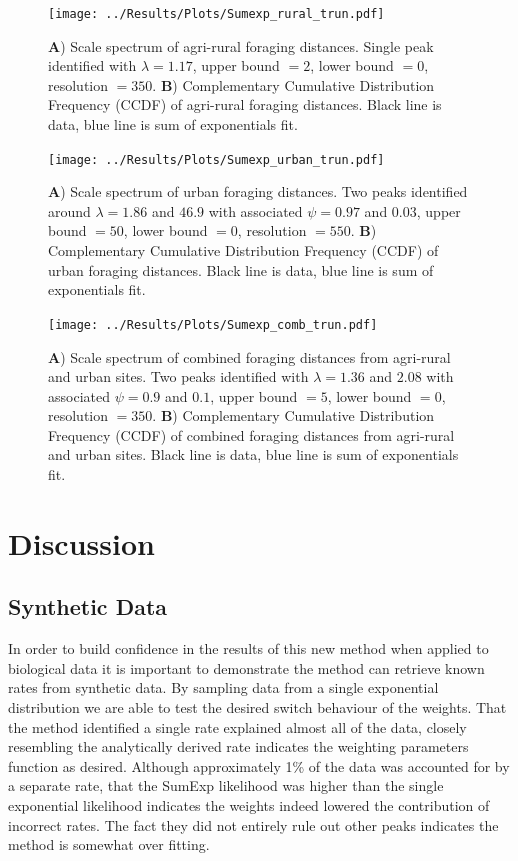 \documentclass[11pt,usenames,dvipsnames]{article}
\begin{document}
\begin{figure}[H]
	\centering
	\texttt{[image: ../Results/Plots/Sumexp\_rural\_trun.pdf]}
	\caption{\textbf{A}) Scale spectrum of agri-rural foraging distances. Single peak identified with $\lambda = 1.17$, upper bound $= 2$, lower bound $= 0$, resolution $= 350$. \textbf{B}) Complementary Cumulative Distribution Frequency (CCDF) of agri-rural foraging distances. Black line is data, blue line is sum of exponentials fit.}
\end{figure}

\begin{figure}[H]
	\centering
	\texttt{[image: ../Results/Plots/Sumexp\_urban\_trun.pdf]}
	\caption{\textbf{A}) Scale spectrum of urban foraging distances. Two peaks identified around $\lambda = 1.86$ and $46.9$ with associated $\psi = 0.97$ and $0.03$, upper bound $= 50$, lower bound $= 0$, resolution $= 550$. \textbf{B}) Complementary Cumulative Distribution Frequency (CCDF) of urban foraging distances. Black line is data, blue line is sum of exponentials fit.}
\end{figure}

\begin{figure}[H]
	\centering
	\texttt{[image: ../Results/Plots/Sumexp\_comb\_trun.pdf]}
	\caption{\textbf{A}) Scale spectrum of combined foraging distances from agri-rural and urban sites. Two peaks identified with $\lambda = 1.36$ and $2.08$ with associated $\psi = 0.9$ and $0.1$, upper bound $=5$, lower bound $= 0$, resolution $= 350$. \textbf{B}) Complementary Cumulative Distribution Frequency (CCDF) of combined foraging distances from agri-rural and urban sites. Black line is data, blue line is sum of exponentials fit.}
\end{figure}

\section{Discussion}

\subsection{Synthetic Data}
In order to build confidence in the results of this new method when applied to biological data it is important to demonstrate the method can retrieve known rates from synthetic data. By sampling data from a single exponential distribution we are able to test the desired switch behaviour of the weights. That the method identified a single rate explained almost all of the data, closely resembling the analytically derived rate indicates the weighting parameters function as desired. Although approximately 1\% of the data was accounted for by a separate rate, that the SumExp likelihood was higher than the single exponential likelihood indicates the weights indeed lowered the contribution of incorrect rates. The fact they did not entirely rule out other peaks indicates the method is somewhat over fitting.
\end{document}
